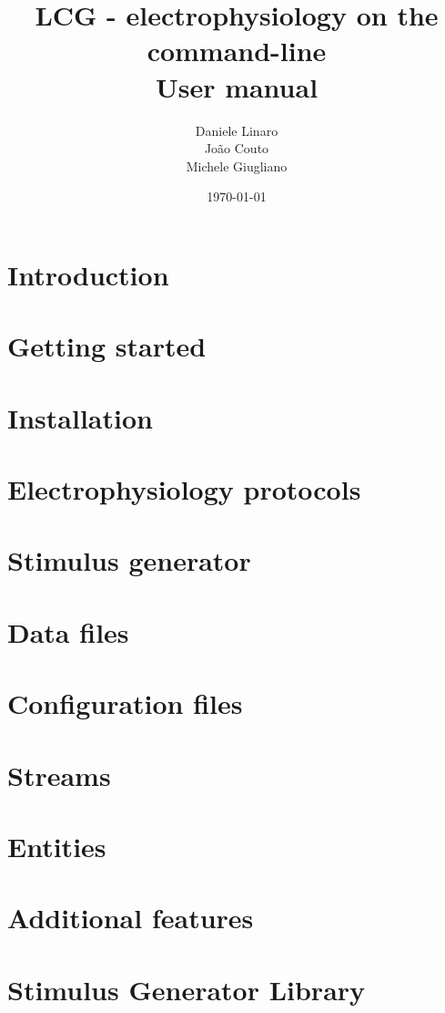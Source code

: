\documentclass[10pt,a4paper,twoside]{book}
\title{\textbf{LCG} - electrophysiology on the command-line \\ User manual}
\author{Daniele Linaro \\ Jo\~ao Couto \\ Michele Giugliano}
\date{\today}
\begin{document}
\maketitle
\thispagestyle{empty}

\tableofcontents
\newpage
{}

\chapter{Introduction}
\label{chap:intro}


\chapter{Getting started}
\label{chap:start}


\chapter{Installation}
\label{chap:installation}


\chapter{Electrophysiology protocols}
\label{chap:protocols}



\chapter{Stimulus generator}
\label{chap:stimgen}


\chapter{Data files}
\label{chap:datafiles}


\chapter{Configuration files}
\label{chap:configuration}


\chapter{Streams}
\label{chap:streams}


\chapter{Entities}
\label{chap:entities}


\chapter{Additional features}
\label{chap:features}





\appendix
\chapter{Stimulus Generator Library}


%
%
\end{document}

